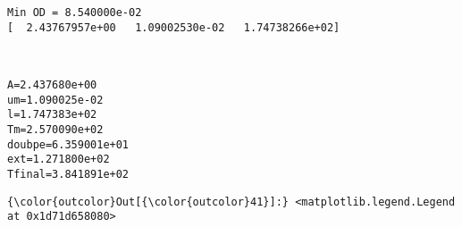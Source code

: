 \documentclass[11pt]{article}
\begin{document}
    \begin{Verbatim}[commandchars=\\\{\}]
Min OD = 8.540000e-02
[  2.43767957e+00   1.09002530e-02   1.74738266e+02]

    \end{Verbatim}

    \begin{center}
    \end{center}
    { \hspace*{\fill} \\}
    
    \begin{Verbatim}[commandchars=\\\{\}]
A=2.437680e+00
um=1.090025e-02
l=1.747383e+02
Tm=2.570090e+02
doubpe=6.359001e+01
ext=1.271800e+02
Tfinal=3.841891e+02

    \end{Verbatim}

            \begin{Verbatim}[commandchars=\\\{\}]
{\color{outcolor}Out[{\color{outcolor}41}]:} <matplotlib.legend.Legend at 0x1d71d658080>
\end{Verbatim}
        
    \begin{center}
    \end{center}
    { \hspace*{\fill} \\}
    
    \begin{center}
    \end{center}
    { \hspace*{\fill} \\}
    
\end{document}
